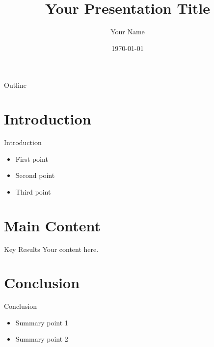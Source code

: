 \documentclass{beamer}
\title{Your Presentation Title}
\author{Your Name}
\institute{Your Institution}
\date{\today}
\begin{document}
\begin{frame}
  \titlepage
\end{frame}

\begin{frame}{Outline}
  \tableofcontents
\end{frame}

\section{Introduction}

\begin{frame}{Introduction}
  \begin{itemize}
    \item First point
    \item Second point
    \item Third point
  \end{itemize}
\end{frame}

\section{Main Content}

\begin{frame}{Key Results}
  Your content here.
\end{frame}

\section{Conclusion}

\begin{frame}{Conclusion}
  \begin{itemize}
    \item Summary point 1
    \item Summary point 2
  \end{itemize}
\end{frame}
\end{document}
